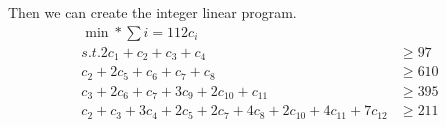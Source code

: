 \documentclass[11pt, oneside]{article}
\begin{document}
\begin{enumerate}
        Then we can create the integer linear program.
        \begin{align*}
            \min* \sum{i = 1}{12}{c_i} \\
            s.t. 
            2c_1 + c_2 + c_3 + c_4 &\ge 97 \\
            c_2 + 2c_5 + c_6 + c_7 + c_8 &\ge 610 \\
            c_3 + 2 c_6 + c_7 + 3c_9 + 2c_{10} + c_{11} &\ge 395 \\
            c_2 + c_3 + 3c_4 + 2c_5 + 2c_7 + 4c_8 + 2c_{10} + 4c_{11} + 7c_{12} &\ge 211
        \end{align*}

\end{enumerate}
\end{document}
